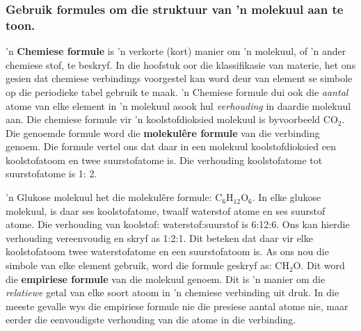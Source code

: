 \subsubsection*{Gebruik formules om die struktuur van 'n molekuul aan te toon.}
 'n \textbf{Chemiese formule} is 'n verkorte (kort) manier om 'n molekuul, of 'n ander chemiese stof, te beskryf. In die hoofstuk oor die klassifikasie van materie, het ons gesien dat chemiese verbindings voorgestel kan word deur van element se simbole op die periodieke tabel gebruik te maak. 'n Chemiese formule dui ook die \textsl{aantal} atome van elke element in 'n molekuul asook hul \textsl{verhouding} in daardie molekuul aan. Die chemiese formule vir 'n koolstofdioksied molekuul is byvoorbeeld ${\text{CO}}_{2}$. Die genoemde formule word die \textbf{molekul\^{e}re formule} van die verbinding genoem. Die formule vertel ons dat daar in een molekuul koolstofdioksied een koolstofatoom en twee suurstofatome is. Die verhouding koolstofatome tot suurstofatome is 1: 2.
        \label{m38120*fhsst!!!underscore!!!id87}

 'n Glukose molekuul het die molekulêre formule: ${\text{C}}_{6}{\text{H}}_{12}{\text{O}}_{6}$. In elke glukose molekuul, is daar ses koolstofatome, twaalf waterstof atome en ses suurstof atome. Die verhouding van koolstof: waterstof:suurstof is 6:12:6. Ons kan hierdie verhouding vereenvoudig en skryf as 1:2:1. Dit beteken dat daar vir elke koolstofatoom twee waterstofatome en een suurstofatoom is. As ons nou die simbole van elke element  gebruik, word die formule geskryf as: ${\text{CH}}_{2}\text{O}$. Dit word die \textbf{empiriese formule} van die molekuul genoem.
        \label{m38120*fhsst!!!underscore!!!id93}
 { Dit is 'n manier om die \textsl{relatiewe} getal van elke soort atoom in 'n chemiese verbinding uit druk. In die meeste gevalle wys die empiriese formule nie die presiese aantal atome nie, maar eerder die eenvoudigste verhouding van die atome in die verbinding.} 

